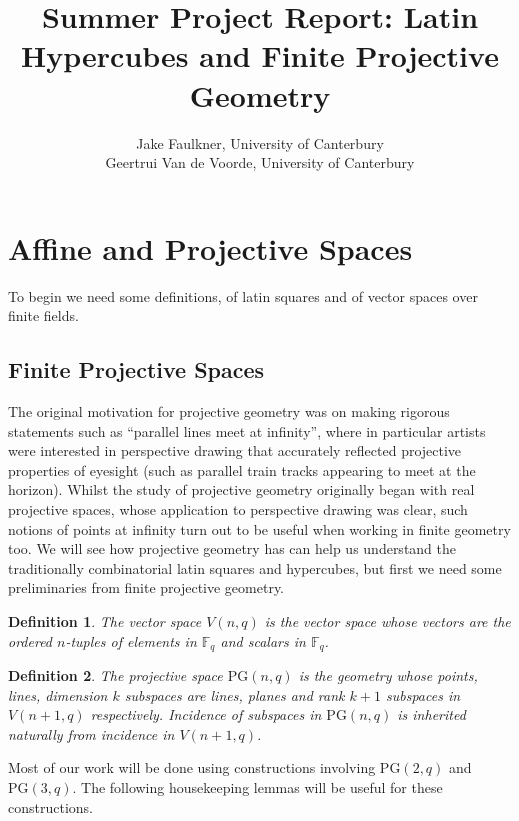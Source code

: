 \documentclass{article}
\title{Summer Project Report: Latin Hypercubes and Finite Projective Geometry}
\author{Jake Faulkner, University of Canterbury \\
  Geertrui Van de Voorde, University of Canterbury}
\date{}
\newtheorem{definition}{Definition}
\newcommand{\PG}{\mathrm{PG}}
\begin{document}
\maketitle
\pagebreak
\section{Affine and Projective Spaces}
To begin we need some definitions, of latin squares and of vector spaces over finite fields.

\subsection{Finite Projective Spaces}

The original motivation for projective geometry was on making rigorous
statements such as “parallel lines meet at infinity”, where in particular artists were interested in perspective drawing that accurately reflected projective properties of eyesight (such as parallel train tracks appearing to meet at the horizon).
Whilst the study of projective geometry originally
began with real projective spaces, whose application to perspective drawing was
clear, such notions of points at infinity turn out to be useful when working in
finite geometry too. We will see how projective geometry has can help us understand the
traditionally combinatorial latin squares and hypercubes, but first we need some
preliminaries from finite projective geometry.

\begin{definition}
  The vector space \(V(n, q)\) is the vector space whose vectors are the ordered \(n\)-tuples of elements in \(\mathbb{F}_q\) and scalars in \(\mathbb{F}_q\).
\end{definition}

\begin{definition}
  The projective space \(\PG(n, q)\) is the geometry whose points, lines, dimension \(k\) subspaces are lines, planes and rank \(k + 1\) subspaces in \(V(n + 1, q)\) respectively. Incidence of subspaces in \(\PG(n, q)\) is inherited naturally from incidence in \(V(n + 1, q)\).
\end{definition}

Most of our work will be done using constructions involving \(\PG(2, q)\) and \(\PG(3, q)\). The following housekeeping lemmas will be useful for these constructions.
\end{document}
